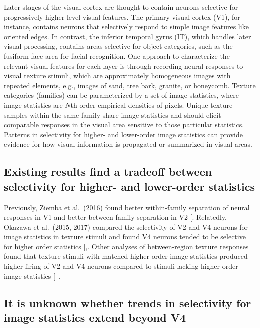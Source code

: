 \documentclass[
  11pt,
  letterpaper,
  DIV=11,
  numbers=noendperiod]{scrartcl}
\begin{document}
Later stages of the visual cortex are thought to contain neurons
selective for progressively higher-level visual features. The primary
visual cortex (V1), for instance, contains neurons that selectively
respond to simple image features like oriented edges. In contrast, the
inferior temporal gyrus (IT), which handles later visual processing,
contains areas selective for object categories, such as the fusiform
face area for facial recognition. One approach to characterize the
relevant visual features for each layer is through recording neural
responses to visual texture stimuli, which are approximately homogeneous
images with repeated elements, e.g., images of sand, tree bark, granite,
or honeycomb. Texture categories (families) can be parameterized by a
set of image statistics, where image statistics are \(N\)th-order
empirical densities of pixels. Unique texture samples within the same
family share image statistics and should elicit comparable responses in
the visual area sensitive to those particular statistics. Patterns in
selectivity for higher- and lower-order image statistics can provide
evidence for how visual information is propagated or summarized in
visual areas.

\subsection{Existing results find a tradeoff between selectivity for
higher- and lower-order
statistics}\label{existing-results-find-a-tradeoff-between-selectivity-for-higher--and-lower-order-statistics}

Previously, Ziemba et al.~(2016) found better within-family separation
of neural responses in V1 and better between-family separation in V2
{[}\citeproc{ref-ziemba_selectivity_2016}{1}{]}. Relatedly, Okazawa et
al.~(2015, 2017) compared the selectivity of V2 and V4 neurons for image
statistics in texture stimuli and found V4 neurons tended to be
selective for higher order statistics
{[},\citeproc{ref-okazawa_gradual_2017}{6}{]}.
Other analyses of between-region texture responses found that texture
stimuli with matched higher order image statistics produced higher
firing of V2 and V4 neurons compared to stimuli lacking higher order
image statistics
{[}--\citeproc{ref-lee_emergence_2025}{4}{]}.

\subsection{It is unknown whether trends in selectivity for image
statistics extend beyond
V4}\label{it-is-unknown-whether-trends-in-selectivity-for-image-statistics-extend-beyond-v4}
\end{document}
